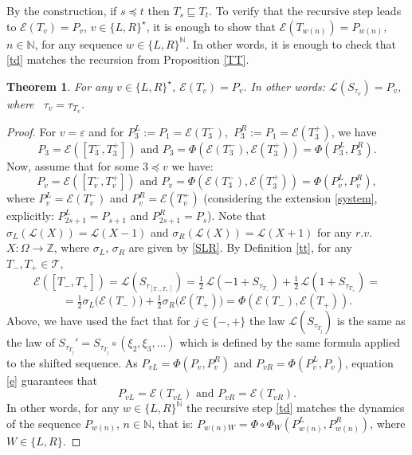 \documentclass[10pt]{amsart}
\newtheorem{theorem}{Theorem}
\theoremstyle{definition}
\numberwithin{equation}{section}
\newcommand{\N}{\mathbb{N}}
\newcommand{\Z}{\mathbb{Z}}
\newcommand{\E}{\mathcal{E}}
\newcommand{\TT}{\mathcal{T}}
\newcommand{\LL}{\mathcal{L}}
\begin{document}
By the construction, if $s\preceq t$ then $T_s\sqsubseteq T_t$. To verify that the recursive step leads to $\mathcal{E}(T_v) = P_{v}$, $v\in\{L,R\}^\star$, it is enough to show that $\E(T_{w(n)}) = P_{w(n)}$, $n\in\N$, for any sequence $w\in\{L,R\}^{\N}$. In other words, it is enough to check that \eqref{td}  matches the recursion from Proposition \ref{TT}.
\begin{theorem}\label{RE}
For any $v\in\{L,R\}^{\star}$, $\mathcal{E}(T_v) = P_{v}$. In other words: $\mathcal{L}(S_{\tau_v}) = P_{v}$, where \ $\tau_v = \tau_{T_v}$.
\end{theorem}
\begin{proof}
For $v=\varepsilon$ and for $P_3^L:=P_1=\E(T_3^-)$,\  $P_3^R:=P_1=\E(T_3^+)$, we have
$$P_3=\mathcal{E}([T^-_3,T^+_3])\mbox{ and } P_3=\Phi(\E(T_3^-),\E(T_3^+))=\Phi(P_3^L,P_3^R).$$
 Now, assume that for some $3\preceq v$ we have:
$$P_v=\mathcal{E}([T^-_v,T^+_v])\mbox{ and } P_v=\Phi(\E(T_3^-),\E(T_3^+))=\Phi(P_v^L,P_v^R),$$
where $P_v^L=\E(T_v^-)$ and $P_v^R=\E(T_v^+)$ (considering the extension \eqref{system}, explicitly: $P_{2s+1}^L=P_{s+1}$ and  $P_{2s+1}^R=P_{s}$). Note that  $\sigma_L(\LL(X))=\LL(X-1)$ and $\sigma_R(\LL(X))=\LL(X+1)$ for any $r.v.$ $X\colon\Omega\to\Z$, where $\sigma_L$, $\sigma _R$ are given by \eqref{SLR}.  By  Definition \ref{tt}, for any $T_-,T_+\in\TT$,
\begin{equation}\label{e} \mathcal{E}([T_-, T_+])=\mathcal{L}(S_{\tau_{[T_-, T_+]}})=  \tfrac{1}{2}\,\mathcal{L}(-1 + S_{\tau_{T_-}}) 
     +\tfrac{1}{2}\,\mathcal{L}(1 + S_{\tau_{T_+}})=\end{equation}
$$ =\tfrac{1}{2} \sigma_L\bigl(\mathcal{E}(T_-)\bigr)
    +   \tfrac{1}{2} \sigma_R\bigl(\mathcal{E}(T_+)\bigr)=\Phi(\E(T_-),\E(T_+)).$$
Above, we have used the fact that for $ j\in \{-,+\}$ the law $\LL(S_{\tau_{T_j}})$ is the same as the law of $S_{\tau_{T_j}}'=S_{\tau_{T_j}}\circ (\xi_2,\xi_3,\dots)$ which is defined by the 
same formula applied to the shifted sequence. As $P_{vL}=\Phi(P_v,P_v^R)$ and $P_{vR}=\Phi(P_v^L,P_v)$,  equation \eqref{e} guarantees that 
$$P_{vL}=\E(T_{vL})\mbox{ and }P_{vR}=\E(T_{vR}).$$
In other words, for any $w\in\{L,R\}^\N$ the recursive step \eqref{td} matches the dynamics of the sequence 
$P_{w(n)}$, ${n\in\N}$, that is: $P_{w(n)W}=\Phi\circ\Phi_W(P_{w(n)}^L,P_{w(n)}^R)$, where $W\in\{L,R\}.$
\end{proof}

\end{document}
